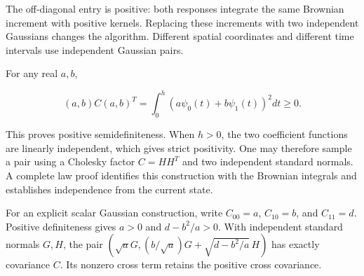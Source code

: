 \documentclass[11pt,a4paper]{article}
\begin{document}
The off-diagonal entry is positive: both responses integrate the same Brownian increment with positive kernels. Replacing these increments with
two independent Gaussians changes the algorithm. Different spatial coordinates
and different time intervals use independent Gaussian pairs.




For any real \(a,b\),


\[(a,b)C(a,b)^T=\int_0^h(a\psi_0(t)+b\psi_1(t))^2dt\ge0.\]


This proves positive semidefiniteness. When \(h>0\), the two coefficient
functions are linearly independent, which gives strict positivity. One may
therefore sample a pair using a Cholesky factor \(C=HH^T\) and two independent
standard normals. A complete law proof identifies this construction with the
Brownian integrals and establishes independence from the current state.



For an explicit scalar Gaussian construction, write \(C_{00}=a\), \(C_{10}=b\), and \(C_{11}=d\). Positive definiteness gives \(a>0\) and \(d-b^2/a>0\). With independent standard normals \(G,H\), the pair \((\sqrt aG,(b/\sqrt a)G+\sqrt{d-b^2/a}\,H)\) has exactly covariance \(C\). Its nonzero cross term retains the positive cross covariance.
\end{document}
